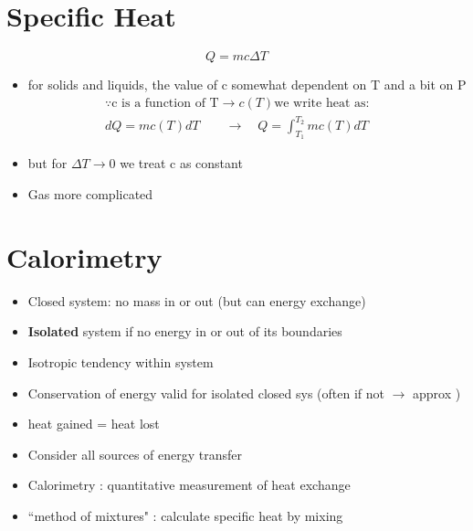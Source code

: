 \documentclass[12 pt , twoside, letterpaper] {article}
\begin{document}
\section{Specific Heat}
	$$Q= mc\Delta T$$	
	\begin{itemize}
		\item for solids and liquids, the value of c somewhat dependent on T and a bit on P
		\begin{align*}
		\because \text{c is a function of T}\rightarrow c(T)\text{we write heat as:}&
		&\\dQ=mc(T)dT \quad\quad \rightarrow\quad
		Q=\int^{T_2}_{T_1}mc(T)dT
		\end{align*}
		\item but for $\Delta T \rightarrow 0$ we treat c as constant
		\item Gas more complicated
	\end{itemize}
	
\section{Calorimetry}
	\begin{itemize}
		\item Closed system: no mass in or out (but can energy exchange)
		\item \textbf{Isolated} system if no energy in or out of its boundaries
		\item Isotropic tendency within system
		\item Conservation of energy valid for  isolated closed sys (often if not $\rightarrow$ approx )
		\item heat gained = heat lost
		\item Consider all sources of energy transfer
		\item Calorimetry : quantitative measurement of heat exchange
		\item ``method of mixtures" : calculate specific heat by mixing 
	\end{itemize}
	
\end{document}
